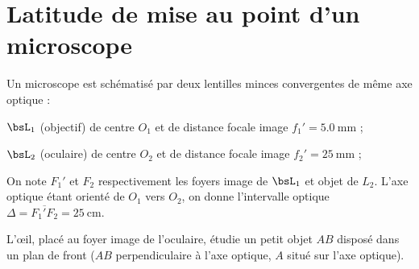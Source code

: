 \documentclass[a4paper,french,bookmarks]{article}
\begin{document}
    \renewcommand{\thesection}{\Roman{section}} 
    \renewcommand{\thesubsection}{\thesection.\Alph{subsection}}
    \renewcommand{\labelenumi}{\thesection.\arabic{enumi}.}
    \renewcommand*{\labelenumii}{\alph{penumii}.}
    \renewcommand*{\labelenumiii}{\alph{enumiii}.}
    
    
    \section{Latitude de mise au point d'un microscope}
    
    Un microscope est schématisé par deux lentilles minces convergentes de même axe optique :
    \begin{enumerate}
        \itt $\bsL_1$ (objectif) de centre $O_1$ et de distance focale image $f_1' = \qty{5.0}{\mm}$ ;
        
        \itt $\bsL_2$ (oculaire) de centre $O_2$ et de distance focale image $f_2' = \qty{25}{\mm}$ ;
    \end{enumerate}
    On note $F_1'$ et $F_2$ respectivement les foyers image de $\bsL_1$ et objet de $L_2$. L'axe optique étant orienté de $O_1$ vers $O_2$, on donne l'intervalle optique $\Delta = \overline{F_1'F_2} = \qty{25}{\cm}$.
    
    L'\oe{}il, placé au foyer image de l'oculaire, étudie un petit objet $AB$ disposé dans un plan de front ($AB$ perpendiculaire à l'axe optique, $A$ situé sur l'axe optique).
    
\end{document}

